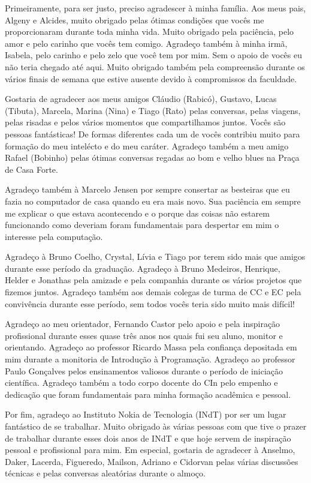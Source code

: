 Primeiramente, para ser justo, preciso agradescer à minha família. Aos meus pais, Algeny e Alcides, muito obrigado pelas ótimas condições que vocês me proporcionaram durante toda minha vida. Muito obrigado pela paciência, pelo amor e pelo carinho que vocês tem comigo. Agradeço também à minha irmã, Isabela, pelo carinho e pelo zelo que você tem por mim. Sem o apoio de vocês eu não teria chegado até aqui. Muito obrigado também pela compreensão durante os vários finais de semana que estive ausente devido à compromissos da faculdade.

Gostaria de agradecer aos meus amigos Cláudio (Rabicó), Gustavo, Lucas (Tibuta), Marcela, Marina (Nina) e Tiago (Rato) pelas conversas, pelas viagens, pelas risadas e pelos vários momentos que compartilhamos juntos. Vocês são pessoas fantásticas! De formas diferentes cada um de vocês contribiu muito para formação do meu intelécto e do meu caráter. Agradeço também a meu amigo Rafael (Bobinho) pelas ótimas conversas regadas ao bom e velho blues na Praça de Casa Forte.

Agradeço também à Marcelo Jensen por sempre consertar as besteiras que eu fazia no computador de casa quando eu era mais novo. Sua paciência em sempre me explicar o que estava acontecendo e o porque das coisas não estarem funcionando como deveriam foram fundamentais para despertar em mim o interesse pela computação.

Agradeço à Bruno Coelho, Crystal, Lívia e Tiago por terem sido mais que amigos durante esse período da graduação. Agradeço à Bruno Medeiros, Henrique, Helder e Jonathas pela amizade e pela companhia durante os vários projetos que fizemos juntos. Agradeço também aos demais colegas de turma de CC e EC pela convivência durante esse período, sem todos vocês teria sido muito mais difícil!

Agradeço ao meu orientador, Fernando Castor pelo apoio e pela inspiração profissional durante esses quase três anos nos quais fui seu aluno, monitor e orientando. Agradeço ao professor Ricardo Massa pela confiança depositada em mim durante a monitoria de Introdução à Programação. Agradeço ao professor Paulo Gonçalves pelos ensinamentos valiosos durante o período de iniciação científica. Agradeço também a todo corpo docente do CIn pelo empenho e dedicação que foram fundamentais para minha formação acadêmica e pessoal.

Por fim, agradeço ao Instituto Nokia de Tecnologia (INdT) por ser um lugar fantástico de se trabalhar. Muito obrigado às várias pessoas com que tive o prazer de trabalhar durante esses dois anos de INdT e que hoje servem de inspiração pessoal e profissional para mim. Em especial, gostaria de agradecer à Anselmo, Daker, Lacerda, Figueredo, Mailson, Adriano e Cidorvan pelas várias discussões técnicas e pelas conversas aleatórias durante o almoço.
